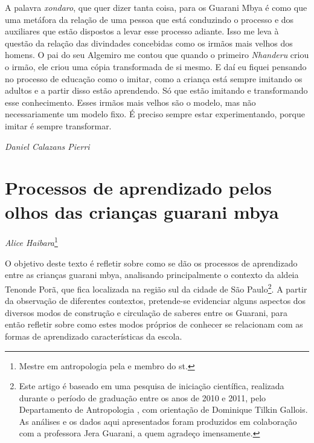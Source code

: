 A palavra \emph{xondaro}, que quer dizer tanta coisa, para os Guarani Mbya é
como que uma metáfora da relação de uma pessoa que está conduzindo o
processo e dos auxiliares que estão dispostos a levar esse processo
adiante. Isso me leva à questão da relação das divindades concebidas
como os irmãos mais velhos dos homens. O pai do seu Algemiro me contou
que quando o primeiro \emph{Nhanderu} criou o irmão, ele criou uma cópia
transformada de si mesmo. E daí eu fiquei pensando no processo de
educação como o imitar, como a criança está sempre imitando os adultos
e a partir disso estão aprendendo. Só que estão imitando e
transformando esse conhecimento. Esses irmãos mais velhos são o modelo,
mas não necessariamente um modelo fixo. É preciso sempre estar
experimentando, porque imitar é sempre transformar.
\medskip
\begin{flushright}
\emph{Daniel Calazans Pierri} 
\end{flushright}

\chapter{Processos de aprendizado pelos olhos das crianças guarani mbya}
\begin{flushright}
\emph{Alice Haibara}\footnote{Mestre em antropologia pela  e membro do
st.}
\end{flushright}

O objetivo deste texto é refletir sobre como se dão os processos de
aprendizado entre as crianças guarani mbya, analisando principalmente o
contexto da aldeia Tenonde Porã, que fica localizada na região sul da
cidade de São Paulo\footnote{Este artigo é baseado em uma pesquisa de
iniciação científica, realizada durante o período de graduação entre os
anos de 2010 e 2011, pelo Departamento de Antropologia , com
orientação de Dominique Tilkin Gallois. As análises e os dados aqui
apresentados foram produzidos em colaboração com a professora Jera
Guarani, a quem agradeço imensamente.}. A partir da observação de
diferentes contextos, pretende-se evidenciar alguns aspectos dos
diversos modos de construção e circulação de saberes entre os Guarani,
para então refletir sobre como estes modos próprios de conhecer se
relacionam com as formas de aprendizado características da escola.

